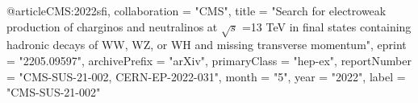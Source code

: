 @article{CMS:2022sfi,
    collaboration = "CMS",
    title = "{Search for electroweak production of charginos and neutralinos at $\sqrt{s}$ =13 TeV in final states containing hadronic decays of WW, WZ, or WH and missing transverse momentum}",
    eprint = "2205.09597",
    archivePrefix = "arXiv",
    primaryClass = "hep-ex",
    reportNumber = "CMS-SUS-21-002, CERN-EP-2022-031",
    month = "5",
    year = "2022",
    label = "CMS-SUS-21-002"
}

